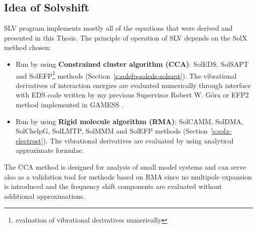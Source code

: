 \documentclass[a4paper,titlepage,twoside,fleqn,12pt]{book}
\begin{document}
\begin{refsection}
\section{Idea of Solvshift}

SLV program implements mostly all of the equations that were derived
and presented in this Thesis. 
The principle of operation of SLV depends on the SolX method chosen:
%
\begin{itemize}
  \item Run by using {\bf Constrained cluster algorithm (CCA)}:
        SolEDS, SolSAPT and SolEFP\footnote{evaluation of vibrational derivatives numerically} 
        methods (Section~\ref{s:solefp-soleds-solsapt}). The vibrational derivatives of interaction
        energies are evaluated numerically through interface with EDS code
        written by my previous Supervisor Robert W. G{\'o}ra \citep{Gora.EDS.1998-2010}
        or EFP2 method implemented in {\sc GAMESS} \citep{GAMESS.JCC.1993}.
  \item Run by using {\bf Rigid molecule algorithm (RMA)}:
        SolCAMM, SolDMA, SolChelpG, SolLMTP, SolMMM and SolEFP methods (Section~\ref{s:solx-electrost}).
        The vibrational derivatives are evaluated by using analytical approximate formulae.
\end{itemize}
%
The CCA method is designed for analysis of small model systems
and can serve also as a validation tool for methods based on RMA
since no multipole expansion is introduced and the frequency shift
components are evaluated without additional approximations.


\end{refsection}
\end{document}
